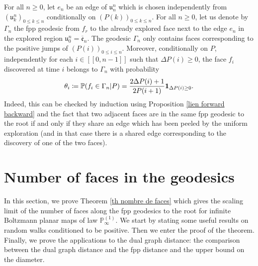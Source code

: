 \documentclass[11pt]{article}
\numberwithin{equation}{section}
\def\P{\mathbb{P}}
\def\lb{[\![}
\def\rb{]\!]}
\begin{document}
{For all $n\ge 0$, let $e_n$ be an edge of $\mathfrak{u}^n_n$ which is chosen independently from $(\mathfrak{u}^n_k)_{0\le k\le n}$ conditionally on $(P(k))_{0\le k \le n}$. }
For all $n\ge 0$, let us denote by $\Gamma_n$ the fpp geodesic from $f_r$ to the already explored face next to {the edge $e_n$ in the explored region $\mathfrak{u}^n_0 = \overline{\mathfrak{e}}_n$.} The geodesic $\Gamma_n$ only contains faces corresponding to the positive jumps of $(P(i))_{0 \le i \le n}$. Moreover, conditionally on $P$, independently for each $i \in \lb 0, n-1\rb$ such that $\Delta P(i)\ge 0$, the face $f_i$ discovered at time $i$ belongs to $\Gamma_n$ with probability
\begin{equation}\label{proba coalescence}
\theta_i\coloneqq \P(f_i \in \Gamma_n \vert P)= \frac{2 \Delta P(i)+1}{2P(i+1)} {\bf 1}_{\Delta P(i) \ge 0}.
\end{equation}
Indeed, this can be checked by induction using Proposition \ref{lien forward backward} and the fact that two adjacent faces are in the same fpp geodesic to the root if and only if they share an edge which has been peeled by the uniform exploration (and in that case there is a shared edge corresponding to the discovery of one of the two faces).
\section{Number of faces in the geodesics}\label{section nombre de faces}

In this section, we prove Theorem \ref{th nombre de faces} which gives the scaling limit of the number of faces along the fpp geodesics to the root for infinite Boltzmann planar maps of law $\P^{(1)}_\infty$. We start by stating some useful results on random walks conditioned to be positive. Then we enter the proof of the theorem. Finally, we prove the applications to the dual graph distance: the comparison between the dual graph distance and the fpp distance and the upper bound on the diameter.
\end{document}
